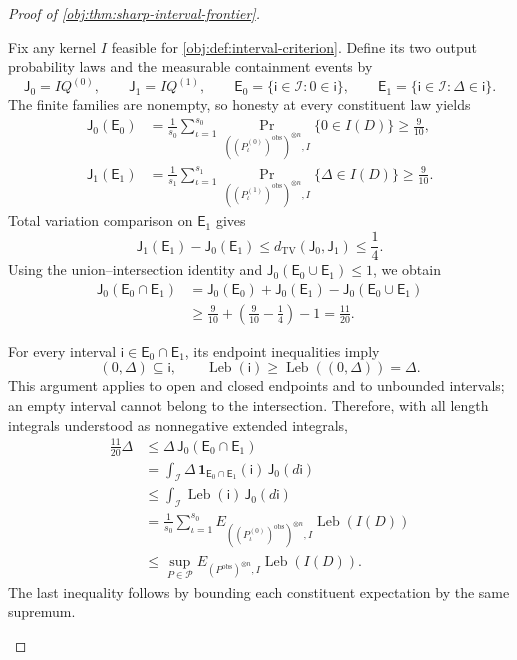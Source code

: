 \documentclass[11pt]{article}
\begin{document}
\begin{proof}[Proof of \cref{obj:thm:sharp-interval-frontier}]
\begin{enumerate}
Fix any kernel \(I\) feasible for \cref{obj:def:interval-criterion}. Define its two output probability laws and the measurable containment events by
\[
\mathsf J_0=IQ^{(0)},
\qquad
\mathsf J_1=IQ^{(1)},
\qquad
\mathsf E_0=\{\mathsf i\in\mathcal I:0\in\mathsf i\},
\qquad
\mathsf E_1=\{\mathsf i\in\mathcal I:\Delta\in\mathsf i\}.
\]
The finite families are nonempty, so honesty at every constituent law yields
\[
\begin{aligned}
\mathsf J_0(\mathsf E_0)
&=
\frac1{s_0}\sum_{\iota=1}^{s_0}
\Pr_{((P^{(0)}_\iota)^{\mathrm{obs}})^{\otimes n},I}
\{0\in I(D)\}
\ge\frac9{10},\\
\mathsf J_1(\mathsf E_1)
&=
\frac1{s_1}\sum_{\iota=1}^{s_1}
\Pr_{((P^{(1)}_\iota)^{\mathrm{obs}})^{\otimes n},I}
\{\Delta\in I(D)\}
\ge\frac9{10}.
\end{aligned}
\]
Total variation comparison on \(\mathsf E_1\) gives
\[
\mathsf J_1(\mathsf E_1)-\mathsf J_0(\mathsf E_1)
\le d_{\mathrm{TV}}(\mathsf J_0,\mathsf J_1)
\le\frac14.
\]
Using the union--intersection identity and
\(\mathsf J_0(\mathsf E_0\cup\mathsf E_1)\le1\), we obtain
\[
\begin{aligned}
\mathsf J_0(\mathsf E_0\cap\mathsf E_1)
&=
\mathsf J_0(\mathsf E_0)+\mathsf J_0(\mathsf E_1)
-\mathsf J_0(\mathsf E_0\cup\mathsf E_1)\\
&\ge\frac9{10}+\left(\frac9{10}-\frac14\right)-1
=\frac{11}{20}.
\end{aligned}
\]

For every interval \(\mathsf i\in\mathsf E_0\cap\mathsf E_1\), its endpoint inequalities imply
\[
(0,\Delta)\subseteq\mathsf i,
\qquad
\operatorname{Leb}(\mathsf i)
\ge\operatorname{Leb}((0,\Delta))=\Delta.
\]
This argument applies to open and closed endpoints and to unbounded intervals; an empty interval cannot belong to the intersection. Therefore, with all length integrals understood as nonnegative extended integrals,
\[
\begin{aligned}
\frac{11}{20}\Delta
&\le\Delta\,\mathsf J_0(\mathsf E_0\cap\mathsf E_1)\\
&=
\int_{\mathcal I}
\Delta\,\mathbf 1_{\mathsf E_0\cap\mathsf E_1}(\mathsf i)
\,\mathsf J_0(d\mathsf i)\\
&\le
\int_{\mathcal I}\operatorname{Leb}(\mathsf i)\,
\mathsf J_0(d\mathsf i)\\
&=
\frac1{s_0}\sum_{\iota=1}^{s_0}
E_{((P^{(0)}_\iota)^{\mathrm{obs}})^{\otimes n},I}
\operatorname{Leb}(I(D))\\
&\le
\sup_{P\in\mathcal P}
E_{(P^{\mathrm{obs}})^{\otimes n},I}
\operatorname{Leb}(I(D)).
\end{aligned}
\]
The last inequality follows by bounding each constituent expectation by the same supremum.


\end{enumerate}
\end{proof}
\end{document}
